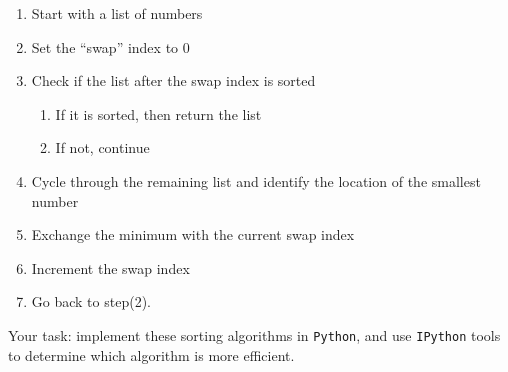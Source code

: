 \documentclass{article}
\begin{document}
\begin{enumerate}
\def\labelenumi{\arabic{enumi}.}
\itemsep1pt\parskip0pt
\item
  Start with a list of numbers
\item
  Set the ``swap'' index to 0
\item
  Check if the list after the swap index is sorted

  \begin{enumerate}
  \def\labelenumii{\arabic{enumii}.}
  \itemsep1pt\parskip0pt
  \item
    If it is sorted, then return the list
  \item
    If not, continue
  \end{enumerate}
\item
  Cycle through the remaining list and identify the location of the
  smallest number
\item
  Exchange the minimum with the current swap index
\item
  Increment the swap index
\item
  Go back to step(2).
\end{enumerate}

Your task: implement these sorting algorithms in \texttt{Python}, and
use \texttt{IPython} tools to determine which algorithm is more
efficient.
\end{document}
